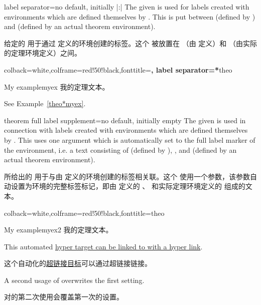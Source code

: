 \begin{docTcbKey}[][doc new=2016-04-19]{label separator}{=}{no default, initially |:|}
The given  is used for labels created with environments which
are defined themselves by . This  is
put between  (defined by )
and  (defined by an actual theorem environment).

给定的  用于通过  定义的环境创建的标签。这个  被放置在 （由  定义）和 （由实际的定理环境定义）之间。
\begin{dispExample}
%
  {colback=white,colframe=red!50!black,fonttitle=\bfseries,
   label separator=*}{theo}
\begin{sometheorem}{My example}{myex}
我的定理文本。
\end{sometheorem}
See Example~\ref{theo*myex}.
\end{dispExample}
\end{docTcbKey}



\begin{docTcbKey}[][doc new=2018-01-12]{theorem full label supplement}{=}{no default, initially empty}
The given  is used in connection with labels created with environments which
are defined themselves by .
This  uses one argument which is automatically set to the
full label marker of the environment, i.e. a text consisting of
 (defined by ),
,
and  (defined by an actual theorem environment).

所给出的  用于与由  定义的环境创建的标签相关联。这个  使用一个参数，该参数自动设置为环境的完整标签标记，即由  定义的 、 和实际定理环境定义的  组成的文本。
\begin{dispExample}

%
   {colback=white,colframe=red!50!black,fonttitle=\bfseries}{theo}
\begin{sometheorem}{My example}{myex2}
我的定理文本。
\end{sometheorem}
This automated \hyperlink{theo:myex2}{hyper target can be linked to with a
 hyper link}.

这个自动化的\hyperlink{theo:myex2}{超链接目标}可以通过超链接链接。
\end{dispExample}

A second usage of  overwrites
the first setting.

对的第二次使用会覆盖第一次的设置。
\end{docTcbKey}


